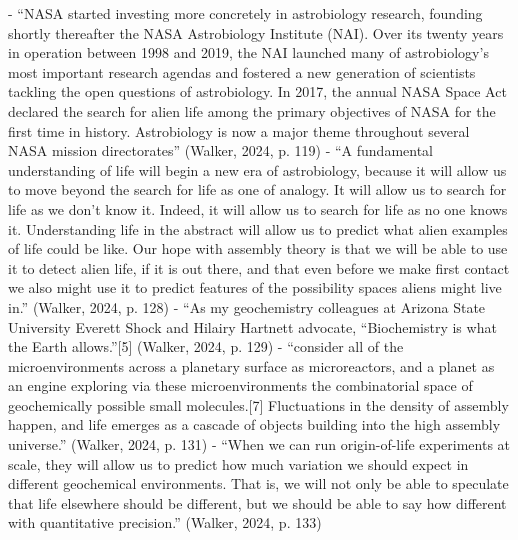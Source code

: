 \documentclass[11pt]{article}
\begin{document}
\begin{markdown}
- “NASA started investing more concretely in astrobiology research, founding shortly thereafter the NASA Astrobiology Institute (NAI). Over its twenty years in operation between 1998 and 2019, the NAI launched many of astrobiology’s most important research agendas and fostered a new generation of scientists tackling the open questions of astrobiology. In 2017, the annual NASA Space Act declared the search for alien life among the primary objectives of NASA for the first time in history. Astrobiology is now a major theme throughout several NASA mission directorates” (Walker, 2024, p. 119)
- “A fundamental understanding of life will begin a new era of astrobiology, because it will allow us to move beyond the search for life as one of analogy. It will allow us to search for life as we don’t know it. Indeed, it will allow us to search for life as no one knows it. Understanding life in the abstract will allow us to predict what alien examples of life could be like. Our hope with assembly theory is that we will be able to use it to detect alien life, if it is out there, and that even before we make first contact we also might use it to predict features of the possibility spaces aliens might live in.” (Walker, 2024, p. 128)
- “As my geochemistry colleagues at Arizona State University Everett Shock and Hilairy Hartnett advocate, “Biochemistry is what the Earth allows.”[5] (Walker, 2024, p. 129)
- “consider all of the microenvironments across a planetary surface as microreactors, and a planet as an engine exploring via these microenvironments the combinatorial space of geochemically possible small molecules.[7] Fluctuations in the density of assembly happen, and life emerges as a cascade of objects building into the high assembly universe.” (Walker, 2024, p. 131)
- “When we can run origin-of-life experiments at scale, they will allow us to predict how much variation we should expect in different geochemical environments. That is, we will not only be able to speculate that life elsewhere should be different, but we should be able to say how different with quantitative precision.” (Walker, 2024, p. 133)

\end{markdown}
\end{document}

